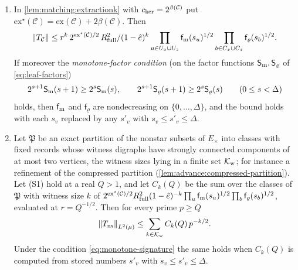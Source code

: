 \begin{corollary}\label{cor:extraction-leaf}
\leavevmode
\begin{enumerate}[label=\textup{(\alph*)}]
\item In \cref{lem:matching:extractionk} with $c_{\rm ker}=2^{\beta(\mathcal C)}$ put
 $\mathrm{ex}^\star(\mathcal C)=\mathrm{ex}(\mathcal C)+2\beta(\mathcal C)$. Then
 \[
  \left\|T_{\mathcal C}\right\|\le r^k\,2^{\mathrm{ex}^\star(\mathcal C)/2}\,
  R_{\rm full}^2/(1-\hat e)^k\prod_{u\in U_x\cup U_z}\mathsf f_{\rm m}(s_u)^{1/2}
  \prod_{b\in C_x\cup C_z}\mathsf f_\varrho(s_b)^{1/2}.
 \]
 If moreover the \emph{monotone-factor condition} (on the
 factor functions $\mathsf S_{\rm m},\mathsf S_\varrho$ of
 \eqref{eq:leaf-factors})
 \begin{equation}\label{eq:monotone-signature}
  2^{s+1}\mathsf S_{\rm m}(s+1)\ge2^s\mathsf S_{\rm m}(s),\qquad
  2^{s+1}\mathsf S_\varrho(s+1)\ge2^s\mathsf S_\varrho(s)\qquad(0\le s<\Delta)
 \end{equation}
 holds, then $\mathsf f_{\rm m}$ and $\mathsf f_\varrho$ are nondecreasing on
 $\{0,\dots,\Delta\}$, and the bound holds with each $s_v$ replaced by any $s'_v$ with
 $s_v\le s'_v\le\Delta$.
\item Let $\mathfrak P$ be an exact partition of the nonstar subsets of $E_\times$
 into classes with fixed records whose witness digraphs have strongly connected
 components of at most two vertices, the witness sizes lying in a finite set
 $\mathcal K_{\rm w}$; for instance a refinement of the compressed partition
 (\cref{lem:advance:compressed-partition}). Let \textup{(S1)} hold at a real
 $Q>1$, and let $C_k(Q)$ be the sum over the classes of $\mathfrak P$ with witness
 size $k$ of
 $2^{\mathrm{ex}^\star(\mathcal C)/2}R_{\rm full}^2(1-\hat e)^{-k}\prod_u\mathsf
 f_{\rm m}(s_u)^{1/2}\prod_b\mathsf f_\varrho(s_b)^{1/2}$, evaluated at $r=Q^{-1/2}$.
 Then for every prime $p\ge Q$
 \[
  \left\|T_{\rm ns}\right\|_{L^2(\mu)}\le\sum_{k\in\mathcal K_{\rm w}}C_k(Q)\,p^{-k/2}.
 \]
 Under the condition \eqref{eq:monotone-signature} the same holds when $C_k(Q)$ is
 computed from stored numbers $s'_v$ with $s_v\le s'_v\le\Delta$.
\end{enumerate}
\end{corollary}

